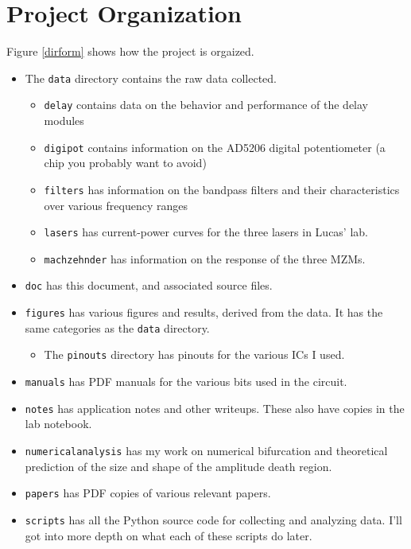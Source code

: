 \documentclass{article}
\newcommand{\code}{\lstinline}
\begin{document}
    \section{Project Organization}
    Figure \ref{dirform}  shows how the project is orgaized.
    \begin{itemize}
        \item The \code{data} directory contains the raw data collected.
        \begin{itemize}
            \item \code{delay} contains data on the behavior and performance of the delay modules
            \item \code{digipot} contains information on the AD5206 digital potentiometer (a chip you probably want to avoid)
            \item \code{filters} has information on the bandpass filters and their characteristics over various frequency ranges
            \item \code{lasers} has current-power curves for the three lasers in Lucas' lab. 
            \item \code{mach}\code{zehnder} has information on the response of the three MZMs.
        \end{itemize}
        \item \code{doc} has this document, and associated source files.
        \item \code{figures} has various figures and results, derived from the data. It has the same categories as the \code{data} directory.
        \begin{itemize}
            \item The \code{pinouts} directory has pinouts for the various ICs I used.
        \end{itemize}
        \item \code{manuals} has PDF manuals for the various bits used in the circuit.
        \item \code{notes} has application notes and other writeups. These also have copies in the lab notebook.
        \item \code{numericalanalysis} has my work on numerical bifurcation and theoretical prediction of the size and shape of the amplitude death region.
        \item \code{papers} has PDF copies of various relevant papers.
        \item \code{scripts} has all the Python source code for collecting and analyzing data. I'll got into more depth on what each of these scripts do later.
    \end{itemize}
    
\end{document}
